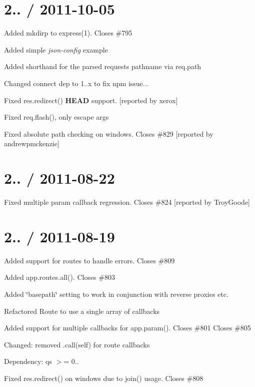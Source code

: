 {\ttfamily \section*{2.. / 2011-\/10-\/05 }}

{\ttfamily }

{\ttfamily 
\begin{DoxyItemize}
\item Added mkdirp to express(1). Closes \#795
\item Added simple {\itshape json-\/config} example
\item Added shorthand for the parsed request\textquotesingle{}s pathname via {\ttfamily req.\+path}
\item Changed connect dep to 1..\+x to fix npm issue...
\item Fixed {\ttfamily res.\+redirect()} {\bfseries H\+E\+AD} support. \mbox{[}reported by xerox\mbox{]}
\item Fixed {\ttfamily req.\+flash()}, only escape args
\item Fixed absolute path checking on windows. Closes \#829 \mbox{[}reported by andrewpmckenzie\mbox{]}
\end{DoxyItemize}}

{\ttfamily \section*{2.. / 2011-\/08-\/22 }}

{\ttfamily }

{\ttfamily 
\begin{DoxyItemize}
\item Fixed multiple param callback regression. Closes \#824 \mbox{[}reported by Troy\+Goode\mbox{]}
\end{DoxyItemize}}

{\ttfamily \section*{2.. / 2011-\/08-\/19 }}

{\ttfamily }

{\ttfamily 
\begin{DoxyItemize}
\item Added support for routes to handle errors. Closes \#809
\item Added {\ttfamily app.\+routes.\+all()}. Closes \#803
\item Added \char`\"{}basepath\char`\"{} setting to work in conjunction with reverse proxies etc.
\item Refactored {\ttfamily Route} to use a single array of callbacks
\item Added support for multiple callbacks for {\ttfamily app.\+param()}. Closes \#801 Closes \#805
\item Changed\+: removed .call(self) for route callbacks
\item Dependency\+: {\ttfamily qs $>$= 0..}
\item Fixed {\ttfamily res.\+redirect()} on windows due to {\ttfamily join()} usage. Closes \#808
\end{DoxyItemize}}

